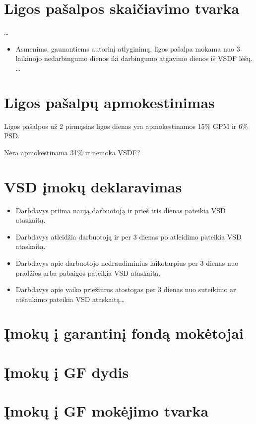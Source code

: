 \section{Ligos pašalpos skaičiavimo tvarka}

…

\begin{itemize}
  \item Asmenims, gaunantiems autorinį atlyginimą, ligos pašalpa mokama
    nuo 3 laikinojo nedarbingumo dienos iki darbingumo atgavimo dienos
    iš VSDF lėšų.
    …
\end{itemize}

\section{Ligos pašalpų apmokestinimas}

Ligos pašalpos už 2 pirmąsias ligos dienas yra apmokestinamos
15\% GPM ir 6\% PSD.

Nėra apmokestinama 31\% ir nemoka VSDF?

\section{VSD įmokų deklaravimas}

\begin{itemize}
  \item Darbdavys priima naują darbuotoją ir prieš tris dienas pateikia
    VSD ataskaitą.
  \item Darbdavys atleidžia darbuotoją ir per 3 dienas po atleidimo
    pateikia VSD ataskaitą.
  \item Darbdavys apie darbuotojo nedraudiminius laikotarpius per 3 dienas
    nuo pradžios arba pabaigos pateikia VSD ataskaitą.
  \item Darbdavys apie vaiko priežiūros atostogas per 3 dienas nuo
    suteikimo ar atšaukimo pateikia VSD ataskaitą…
\end{itemize}

\section{Įmokų į garantinį fondą mokėtojai}

\section{Įmokų į GF dydis}

\section{Įmokų į GF mokėjimo tvarka}


